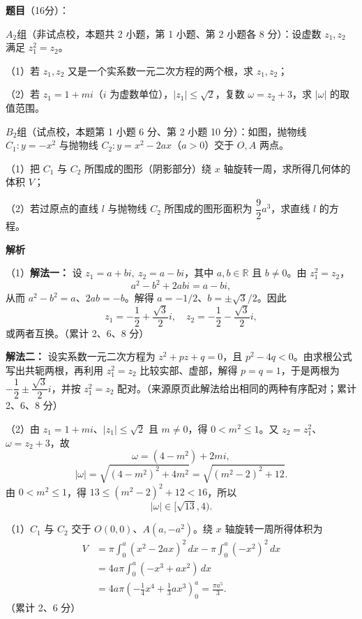 \begin{answer}

\textbf{题目}（16分）：

$A_2$组（非试点校，本题共 2 小题，第 1 小题、第 2 小题各 8 分）：设虚数 $z_1,z_2$ 满足 $z_1^2=z_2$。

（1）若 $z_1,z_2$ 又是一个实系数一元二次方程的两个根，求 $z_1,z_2$；

（2）若 $z_1=1+mi$（$i$ 为虚数单位），$|z_1|\le\sqrt2$，复数 $\omega=z_2+3$，求 $|\omega|$ 的取值范围。

$B_2$组（试点校，本题第 1 小题 6 分、第 2 小题 10 分）：如图，抛物线 $C_1:y=-x^2$ 与抛物线 $C_2:y=x^2-2ax$（$a>0$）交于 $O,A$ 两点。

（1）把 $C_1$ 与 $C_2$ 所围成的图形（阴影部分）绕 $x$ 轴旋转一周，求所得几何体的体积 $V$；

（2）若过原点的直线 $l$ 与抛物线 $C_2$ 所围成的图形面积为 $\dfrac92a^3$，求直线 $l$ 的方程。
\nopagebreak[4]
\begin{center}\end{center}
\nopagebreak[4]
\textbf{解析}

（1）\textbf{解法一：} 设 $z_1=a+bi,\ z_2=a-bi$，其中 $a,b\in\mathbb R$ 且 $b\ne0$。由 $z_1^2=z_2$，
\nopagebreak[4]
\[a^2-b^2+2abi=a-bi,\]
从而 $a^2-b^2=a$、$2ab=-b$。解得 $a=-1/2$、$b=\pm\sqrt3/2$。因此
\nopagebreak[4]
\[z_1=-\frac12+\frac{\sqrt3}{2}i,\quad z_2=-\frac12-\frac{\sqrt3}{2}i,\]
或两者互换。（累计 2、6、8 分）

\textbf{解法二：} 设实系数一元二次方程为 $z^2+pz+q=0$，且 $p^2-4q<0$。由求根公式写出共轭两根，再利用 $z_1^2=z_2$ 比较实部、虚部，解得 $p=q=1$，于是两根为 $-\dfrac12\pm\dfrac{\sqrt3}{2}i$，并按 $z_1^2=z_2$ 配对。（来源原页此解法给出相同的两种有序配对；累计 2、6、8 分）

（2）由 $z_1=1+mi$、$|z_1|\le\sqrt2$ 且 $m\ne0$，得 $0<m^2\le1$。又 $z_2=z_1^2$、$\omega=z_2+3$，故
\nopagebreak[4]
\[\omega=(4-m^2)+2mi,\]
\nopagebreak[4]
\[|\omega|=\sqrt{(4-m^2)^2+4m^2}=\sqrt{(m^2-2)^2+12}.\]
由 $0<m^2\le1$，得 $13\le(m^2-2)^2+12<16$，所以
\nopagebreak[4]
\[|\omega|\in[\sqrt{13},4).\]

（1）$C_1$ 与 $C_2$ 交于 $O(0,0)$、$A(a,-a^2)$。绕 $x$ 轴旋转一周所得体积为
\nopagebreak[4]
\[\begin{aligned}
V&=\pi\int_0^a(x^2-2ax)^2\,dx-\pi\int_0^a(-x^2)^2\,dx\\
&=4a\pi\int_0^a(-x^3+ax^2)\,dx\\
&=4a\pi\left(-\frac14x^4+\frac13ax^3\right)_0^a
=\frac{\pi a^5}{3}.
\end{aligned}\]
（累计 2、6 分）


\end{answer}
